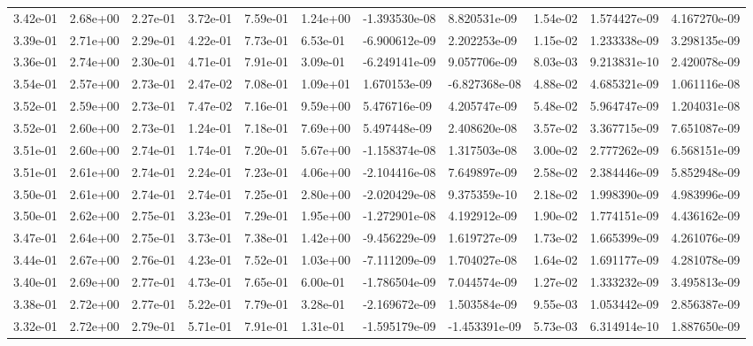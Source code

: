 \begin{longtable}{| p{} | p{} |}
3.42e-01 & 2.68e+00 & 2.27e-01 & 3.72e-01 & 7.59e-01 & 1.24e+00 & -1.393530e-08 &  8.820531e-09 &  1.54e-02 &  1.574427e-09 &  4.167270e-09 \\
3.39e-01 & 2.71e+00 & 2.29e-01 & 4.22e-01 & 7.73e-01 & 6.53e-01 & -6.900612e-09 &  2.202253e-09 &  1.15e-02 &  1.233338e-09 &  3.298135e-09 \\
3.36e-01 & 2.74e+00 & 2.30e-01 & 4.71e-01 & 7.91e-01 & 3.09e-01 & -6.249141e-09 &  9.057706e-09 &  8.03e-03 &  9.213831e-10 &  2.420078e-09 \\
3.54e-01 & 2.57e+00 & 2.73e-01 & 2.47e-02 & 7.08e-01 & 1.09e+01 &  1.670153e-09 & -6.827368e-08 &  4.88e-02 &  4.685321e-09 &  1.061116e-08 \\
3.52e-01 & 2.59e+00 & 2.73e-01 & 7.47e-02 & 7.16e-01 & 9.59e+00 &  5.476716e-09 &  4.205747e-09 &  5.48e-02 &  5.964747e-09 &  1.204031e-08 \\
3.52e-01 & 2.60e+00 & 2.73e-01 & 1.24e-01 & 7.18e-01 & 7.69e+00 &  5.497448e-09 &  2.408620e-08 &  3.57e-02 &  3.367715e-09 &  7.651087e-09 \\
3.51e-01 & 2.60e+00 & 2.74e-01 & 1.74e-01 & 7.20e-01 & 5.67e+00 & -1.158374e-08 &  1.317503e-08 &  3.00e-02 &  2.777262e-09 &  6.568151e-09 \\
3.51e-01 & 2.61e+00 & 2.74e-01 & 2.24e-01 & 7.23e-01 & 4.06e+00 & -2.104416e-08 &  7.649897e-09 &  2.58e-02 &  2.384446e-09 &  5.852948e-09 \\
3.50e-01 & 2.61e+00 & 2.74e-01 & 2.74e-01 & 7.25e-01 & 2.80e+00 & -2.020429e-08 &  9.375359e-10 &  2.18e-02 &  1.998390e-09 &  4.983996e-09 \\
3.50e-01 & 2.62e+00 & 2.75e-01 & 3.23e-01 & 7.29e-01 & 1.95e+00 & -1.272901e-08 &  4.192912e-09 &  1.90e-02 &  1.774151e-09 &  4.436162e-09 \\
3.47e-01 & 2.64e+00 & 2.75e-01 & 3.73e-01 & 7.38e-01 & 1.42e+00 & -9.456229e-09 &  1.619727e-09 &  1.73e-02 &  1.665399e-09 &  4.261076e-09 \\
3.44e-01 & 2.67e+00 & 2.76e-01 & 4.23e-01 & 7.52e-01 & 1.03e+00 & -7.111209e-09 &  1.704027e-08 &  1.64e-02 &  1.691177e-09 &  4.281078e-09 \\
3.40e-01 & 2.69e+00 & 2.77e-01 & 4.73e-01 & 7.65e-01 & 6.00e-01 & -1.786504e-09 &  7.044574e-09 &  1.27e-02 &  1.333232e-09 &  3.495813e-09 \\
3.38e-01 & 2.72e+00 & 2.77e-01 & 5.22e-01 & 7.79e-01 & 3.28e-01 & -2.169672e-09 &  1.503584e-09 &  9.55e-03 &  1.053442e-09 &  2.856387e-09 \\
3.32e-01 & 2.72e+00 & 2.79e-01 & 5.71e-01 & 7.91e-01 & 1.31e-01 & -1.595179e-09 & -1.453391e-09 &  5.73e-03 &  6.314914e-10 &  1.887650e-09 \\

\end{longtable}
